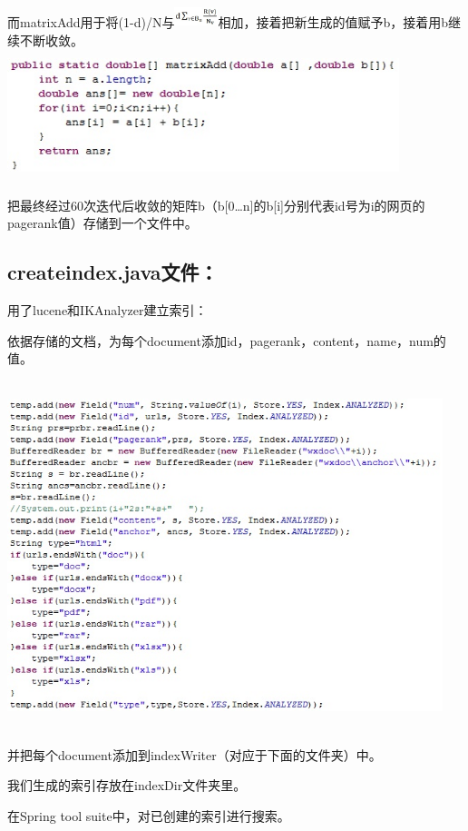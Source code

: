 ﻿\documentclass[UTF8]{ctexart}
\begin{document}
\begin{flushleft}
而matrixAdd用于将(1-d)/N与\includegraphics[width=0.50in,height=0.25in]{figure18.jpg}相加，接着把新生成的值赋予b，接着用b继续不断收敛。
\includegraphics[width=4.50in,height=1.50in]{figure19.jpg}
\par{}
把最终经过60次迭代后收敛的矩阵b（b[0…n]的b[i]分别代表id号为i的网页的pagerank值）存储到一个文件中。
\subsection{createindex.java文件：}
用了lucene和IKAnalyzer建立索引：
\par{}
依据存储的文档，为每个document添加id，pagerank，content，name，num的值。
\par{}
\includegraphics[width=5.00in,height=4.00in]{figure20.jpg}
\par{}
并把每个document添加到indexWriter（对应于下面的文件夹）中。
\par{}
我们生成的索引存放在indexDir文件夹里。
\par{}
在Spring tool suite中，对已创建的索引进行搜索。
\par{}

\end{flushleft}
\end{document}
